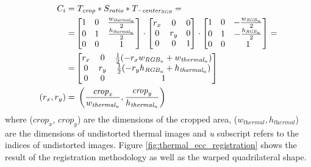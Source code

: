 \begin{gather}
    \label{eq:cropping_composite_matrix}
    \begin{aligned}
        C_{i} = & \hspace{1mm} T_{\textit{crop}} * S_{\textit{ratio}} * T_{-\textit{center}_{\textit{RGB}}} =\\
           = &\begin{bmatrix}
                        1 & 0 & \frac{w_{\textit{thermal}_u}}{2}\\
                        0 & 1 & \frac{h_{\textit{thermal}_u}}{2}\\
                        0 & 0 & 1
                    \end{bmatrix} \cdot 
                    \begin{bmatrix}
                        r_x & 0 & 0\\
                        0 & r_y & 0\\
                        0 & 0 & 1
                    \end{bmatrix} \cdot
                    \begin{bmatrix}
                        1 & 0 & -\frac{w_{\textit{RGB}_u}}{2}\\
                        0 & 1 & -\frac{h_{\textit{RGB}_u}}{2}\\
                        0 & 0 & 1
                    \end{bmatrix} =\\
                    = &\begin{bmatrix}
                        r_x & 0 & \frac{1}{2}(-r_{x} w_{\textit{RGB}_u} + w_{\textit{thermal}_u})\\
                        0 & r_y & \frac{1}{2}(-r_{y} h_{\textit{RGB}_u} + h_{\textit{thermal}_u})\\
                        0 & 0 & 1
                    \end{bmatrix}\\
        (r_x, r_y) = & \hspace{1mm} \left(\frac{\textit{crop}_x}{w_{\textit{thermal}_u}}, \frac{\textit{crop}_y}{h_{\textit{thermal}_u}}\right)
    \end{aligned}
\end{gather}
where ($\textit{crop}_x$, $\textit{crop}_y$) are the dimensions of the cropped area, ($w_{\textit{thermal}}, h_{\textit{thermal}}$) are the dimensions of undistorted thermal images and \textit{u} subscript refers to the indices of undistorted images. Figure \ref{fig:thermal_ecc_registration} shows the result of the registration methodology as well as the warped quadrilateral shape.

